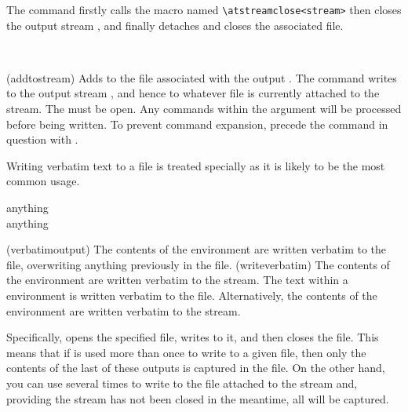 {{{{    The command \cmd{\closeoutputstream} firstly calls the macro named
\verb?\atstreamclose<stream>? then closes the
output stream , and finally detaches and 
closes the associated file.

\begin{syntax}
\cmd{\addtostream} \\
\end{syntax}
\glossary(addtostream)%
  {}%
  {Adds  to the file associated with the output .}
The \cmd{\addtostream} command writes  to the output stream
, and hence to whatever file is currently attached to the
stream. The  must be open. Any commands within the 
argument will be processed before being written. To prevent command
expansion, precede the command in question with \cmd{\protect}.

    Writing verbatim text to a file is 
treated specially as it is likely
to be the most common usage.
\begin{syntax}
 anything  \\
 anything  \\
\end{syntax}
\glossary(verbatimoutput)%
  {}%
  {The contents of the environment are written verbatim to the  
   file, overwriting anything previously in the file.}
\glossary(writeverbatim)%
  {}%
  {The contents of the environment are written verbatim to the  
   stream.}
The text within a  environment is written verbatim
to the  file. Alternatively, the contents of the
 environment are written verbatim to the  
stream. 

    Specifically,  opens the specified file, writes
to it, and then closes the file. This means that if 
is used more than once to write to a given
file, then only the contents of the last of these outputs is captured 
in the file.
On the other hand, you can use  several times to write
to the file attached to the stream and, providing the stream has not
been closed in the meantime, all will be captured.


}}}}
